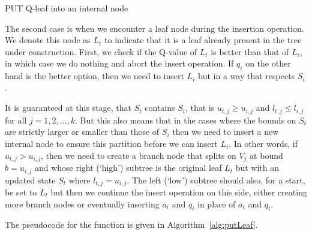 \begin{algorithm}[ht]
    \caption{PUT Q-leaf into an internal node}\label{alg:putInternal}

    \begin{algorithmic}[1]
            
        \EndIf%
        \EndIf%

        \EndFunction%

    \end{algorithmic}

\end{algorithm}

The second case is when we encounter a leaf node during the insertion operation.
We denote this node as $L_t$ to indicate that it is a leaf already present in
the tree under construction. First, we check if the Q-value of $L_t$ is better
than that of $L_i$, in which case we do nothing and abort the insert operation.
If $q_i$ on the other hand is the better option, then we need to insert $L_i$
but in a way that respects $S_i$.

It is guaranteed at this stage, that $S_t$ contains $S_i$, that is $u_{t,j} \geq
u_{i,j}$ and $l_{t,j} \leq l_{i,j}$ for all $j=1,2,\ldots,k$. But this also
means that in the cases where the bounds on $S_t$ are strictly larger or smaller
than those of $S_i$ then we need to insert a new internal node to ensure this
partition before we can insert $L_i$. In other words, if $u_{t,j} > u_{i,j}$,
then we need to create a branch node that splits on $V_j$ at bound $b =
u_{i,j}$ and whose right (`high') subtree is the original leaf $L_t$ but with an
updated state $S_t$ where $l_{t,j} = u_{i,j}$. The left (`low') subtree should
also, for a start, be set to $L_t$ but then we continue the insert operation on
this side, either creating more branch nodes or eventually inserting $a_i$ and
$q_i$ in place of $a_t$ and $q_t$.

The pseudocode for the function is given in Algorithm~\ref{alg:putLeaf}.

